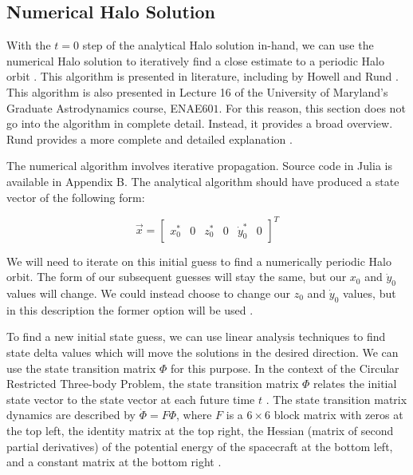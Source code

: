 \documentclass[conf]{new-aiaa}
\begin{document}
\newpage
\begin{multicols}{2}

\subsection{Numerical Halo Solution}

With the $t=0$ step of the analytical Halo solution in-hand, we can use the numerical 
Halo solution to iteratively find a close estimate to a periodic Halo orbit 
\cite{rund2018interplanetary}. This algorithm is presented in literature, 
including by Howell and Rund \cite{howell1984three} \cite{rund2018interplanetary}. 
This algorithm is also presented in Lecture 16 of the University of Maryland's 
Graduate Astrodynamics course, ENAE$601$. For this reason, this section does not 
go into the algorithm in complete detail. Instead, it provides a broad overview.
Rund provides a more complete and detailed explanation \cite{rund2018interplanetary}.

The numerical algorithm involves iterative propagation. Source code in Julia is available
in Appendix B. The analytical algorithm should have produced a state vector of the following form:

\begin{equation*}
\overrightarrow{x} = \begin{bmatrix} x_0^* & 0 & z_0^* & 0 & \dot{y}_0^* & 0 \end{bmatrix}^T
\end{equation*}

We will need to iterate on this initial guess to find a numerically periodic Halo orbit. 
The form of our subsequent guesses will stay the same, but our $x_0$ and $\dot{y}_0$ values 
will change. We could instead choose to change our $z_0$ and $\dot{y}_0$ values, but in 
this description the former option will be used \cite{rund2018interplanetary} 
\cite{howell1984three}. 

To find a new initial state guess, we can use linear analysis techniques to find 
state delta values which will move the solutions in the desired direction. We can 
use the state transition matrix $\Phi$ for this purpose. In the context of the 
Circular Restricted Three-body Problem, the state transition matrix 
$\Phi$ relates the initial state vector to the state vector at each future time $t$ 
\cite{rund2018interplanetary}. The state transition matrix dynamics are described by 
$\dot{\Phi} = F \Phi$, where $F$ is a $6\times 6$ block matrix with zeros at the top left,
the identity matrix at the top right, the Hessian (matrix of second partial derivatives)
of the potential energy of the spacecraft at the bottom left, and a constant matrix at 
the bottom right \cite{rund2018interplanetary}.


\end{multicols}
\end{document}
